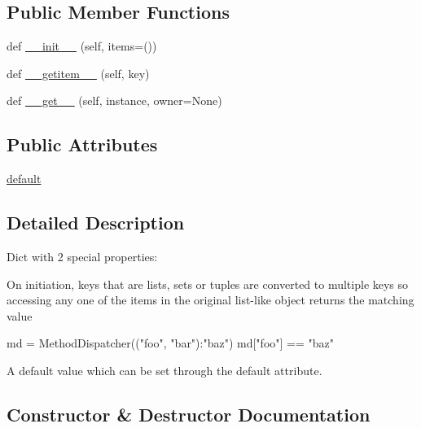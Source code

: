 \subsection*{Public Member Functions}
\begin{DoxyCompactItemize}
\item 
def \hyperlink{classpip_1_1__vendor_1_1html5lib_1_1__utils_1_1MethodDispatcher_a0cffa50fa80b8bbb45db27db72547676}{\+\_\+\+\_\+init\+\_\+\+\_\+} (self, items=())
\item 
def \hyperlink{classpip_1_1__vendor_1_1html5lib_1_1__utils_1_1MethodDispatcher_a2da090d2a1877af19f1fa6a462bcc815}{\+\_\+\+\_\+getitem\+\_\+\+\_\+} (self, key)
\item 
def \hyperlink{classpip_1_1__vendor_1_1html5lib_1_1__utils_1_1MethodDispatcher_a192a0dd5f49abcef3587d734bda9f9fc}{\+\_\+\+\_\+get\+\_\+\+\_\+} (self, instance, owner=None)
\end{DoxyCompactItemize}
\subsection*{Public Attributes}
\begin{DoxyCompactItemize}
\item 
\hyperlink{classpip_1_1__vendor_1_1html5lib_1_1__utils_1_1MethodDispatcher_a2ac5c9766e49e08ca9d77597acec409d}{default}
\end{DoxyCompactItemize}


\subsection{Detailed Description}
\begin{DoxyVerb}Dict with 2 special properties:

On initiation, keys that are lists, sets or tuples are converted to
multiple keys so accessing any one of the items in the original
list-like object returns the matching value

md = MethodDispatcher({("foo", "bar"):"baz"})
md["foo"] == "baz"

A default value which can be set through the default attribute.
\end{DoxyVerb}
 

\subsection{Constructor \& Destructor Documentation}
\mbox{\label{classpip_1_1__vendor_1_1html5lib_1_1__utils_1_1MethodDispatcher_a0cffa50fa80b8bbb45db27db72547676}} 
